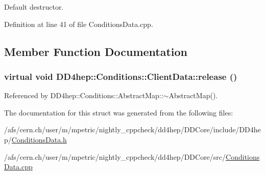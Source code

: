 Default destructor. 

Definition at line 41 of file ConditionsData.cpp.

\subsection{Member Function Documentation}
\hypertarget{struct_d_d4hep_1_1_conditions_1_1_client_data_a70db3debbb53fc7249ca198a2cd32e9b}{
\subsubsection[{release}]{\setlength{\rightskip}{0pt plus 5cm}virtual void DD4hep::Conditions::ClientData::release ()}}
\label{struct_d_d4hep_1_1_conditions_1_1_client_data_a70db3debbb53fc7249ca198a2cd32e9b}


Referenced by DD4hep::Conditions::AbstractMap::$\sim$AbstractMap().

The documentation for this struct was generated from the following files:\begin{DoxyCompactItemize}
\item 
/afs/cern.ch/user/m/mpetric/nightly\_\-cppcheck/dd4hep/DDCore/include/DD4hep/\hyperlink{_conditions_data_8h}{ConditionsData.h}\item 
/afs/cern.ch/user/m/mpetric/nightly\_\-cppcheck/dd4hep/DDCore/src/\hyperlink{_conditions_data_8cpp}{ConditionsData.cpp}\end{DoxyCompactItemize}
